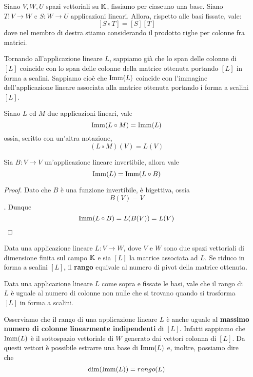 \begin{theorem}
	Siano $V, W, U$ spazi vettoriali su $\mathbb{K}$, fissiamo per ciascuno
	una base. Siano $T : V \to W$ e $S : W \to U$ applicazioni lineari. Allora,
	rispetto alle basi fissate, vale:
	\[
		[S \circ T] = [S][T]
	\]
	dove nel membro di destra stiamo considerando il prodotto righe per colonne
	fra matrici.
\end{theorem}

Tornando all'applicazione lineare $L$, sappiamo già che lo span delle colonne
di $[L]$ coincide con lo span delle colonne della matrice ottenuta portando $[L]$
in forma a scalini. Sappiamo cioè che $\operatorname{Imm}(L)$ coincide con l'immagine
dell'applicazione lineare associata alla matrice ottenuta portando i forma a
scalini $[L]$.

\begin{proposition}
	Siano $L$ ed $M$ due applicazioni lineari, vale
	\[ \operatorname{Imm}(L \circ M) = \operatorname{Imm}(L) \]
	ossia, scritto con un'altra notazione,
	\[ (L \circ M)(V) = L(V) \]
\end{proposition}

\begin{proposition}
	Sia $B : V \to V$ un'applicazione lineare invertibile, allora vale
	\[ \operatorname{Imm}(L) = \operatorname{Imm}(L \circ B) \]
	\begin{proof}
		Dato che $B$ è una funzione invertibile, è bigettiva, ossia
		\[ B(V) = V \]. Dunque
		\[
			\operatorname{Imm}(L \circ B) = L(B(V)) = L(V)
		\]
	\end{proof}
\end{proposition}

\begin{definition}
	Data una applicazione lineare $L : V \to W$, dove $V$ e $W$ sono due spazi
	vettoriali di dimensione finita sul campo $\mathbb{K}$ e sia $[L]$ la matrice
	associata ad $L$. Se riduco in forma a scalini $[L]$, il \textbf{rango} equivale
	al numero di pivot della matrice ottenuta.
\end{definition}

\begin{theorem}
	Data una applicazione lineare $L$ come sopra e fissate le basi, vale che
	il rango di $L$ è uguale al numero di colonne non nulle che si trovano
	quando si trasforma $[L]$ in forma a scalini.
\end{theorem}

\begin{observation}
	Osserviamo che il rango di una applicazione lineare $L$ è anche uguale al
	\textbf{massimo numero di colonne linearmente indipendenti} di $[L]$.
	Infatti sappiamo che $\operatorname{Imm}(L)$ è il sottospazio vettoriale di $W$ generato
	dai vettori colonna di $[L]$. Da questi vettori è possibile estrarre una
	base di $\operatorname{Imm}(L)$ e, inoltre, possiamo dire che \[\dim(\operatorname{Imm}(L)) = rango (L)\]
\end{observation}

